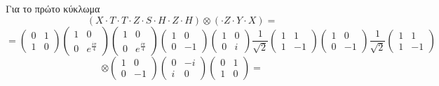 \documentclass[12pt]{article}
\begin{document}
\section*{{}}
Για το πρώτο κύκλωμα 
$$
(X\cdot T \cdot T  \cdot Z  \cdot S \cdot H \cdot Z \cdot H) \otimes ( \cdot Z \cdot Y \cdot X) = $$
$$=\begin{pmatrix} 0 & 1 \\ 1 & 0\end{pmatrix}\begin{pmatrix} 1 & 0 \\ 0 & e^{\frac{i\pi}{4}}\end{pmatrix}\begin{pmatrix} 1 & 0 \\ 0 & e^{\frac{i\pi}{4}}\end{pmatrix}
\begin{pmatrix} 1 & 0 \\ 0 & -1\end{pmatrix}\begin{pmatrix} 1 & 0 \\ 0 & i\end{pmatrix}\frac{1}{\sqrt{2}}\begin{pmatrix} 1 & 1\\ 1 &-1\end{pmatrix}\begin{pmatrix} 1 & 0 \\ 0 & -1\end{pmatrix}
\frac{1}{\sqrt{2}}\begin{pmatrix} 1 & 1\\ 1 &-1\end{pmatrix}$$
$$ \otimes \begin{pmatrix} 1 & 0 \\ 0 & -1 \end{pmatrix}\begin{pmatrix} 0 & -i \\ i & 0\end{pmatrix}\begin{pmatrix} 0 & 1 \\ 1 & 0\end{pmatrix}  = 
$$
\end{document}
